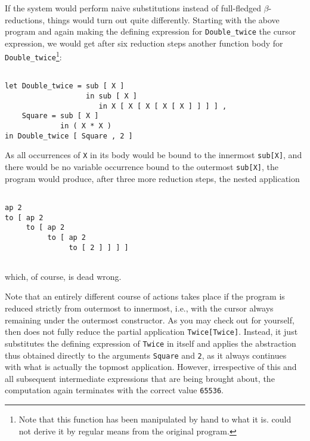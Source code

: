 If the system would perform {\mys naive substitutions} instead of full-fledged
$\beta$-reductions, things would turn out quite  differently. Starting 
with the above program and again making the defining expression for
{\tt Double\_twice} the cursor expression, we would get after six reduction steps
another function body for {\tt Double\_twice}\footnote{Note that this 
function has been manipulated by hand to what it is. \pired could
not derive it by regular means from the original program.}:
\begin{verbatim}

let Double_twice = sub [ X ]
                   in sub [ X ]
                      in X [ X [ X [ X [ X ] ] ] ] ,
    Square = sub [ X ]
             in ( X * X )
in Double_twice [ Square , 2 ]

\end{verbatim}
As all  occurrences of {\tt X} in its body would be bound to the innermost
{\tt sub[X]}, and there would be no variable occurrence bound to the
outermost {\tt sub[X]}, the program would produce, after three more
reduction steps, the nested application
\begin{verbatim}

ap 2
to [ ap 2
     to [ ap 2
          to [ ap 2
               to [ 2 ] ] ] ]


\end{verbatim}
which, of course, is dead wrong.

Note that an entirely different course of actions takes place if the
program is reduced strictly from outermost to innermost, i.e., with
the cursor always remaining under the outermost constructor. As you
 may check out for yourself, \pired then does not fully reduce the
partial application {\tt Twice[Twice]}. Instead, it just substitutes the 
defining expression
of {\tt Twice} in itself and applies the abstraction thus obtained
directly to the
arguments {\tt Square} and {\tt 2}, as it always continues with what
is actually the topmost application. However, irrespective of this
and all subsequent 
intermediate expressions that are being brought about, the computation 
again terminates with the correct value {\tt 65536}.

